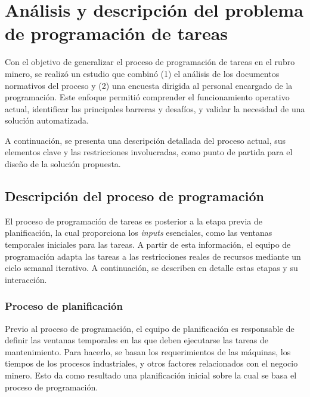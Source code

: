 \documentclass{article}
\begin{document}



\section{Análisis y descripción del problema de programación de tareas}

Con el objetivo de generalizar el proceso de programación de tareas en el rubro minero, se realizó un estudio que combinó (1) el análisis de los documentos normativos del proceso y (2) una encuesta dirigida al personal encargado de la programación. Este enfoque permitió comprender el funcionamiento operativo actual, identificar las principales barreras y desafíos, y validar la necesidad de una solución automatizada.

A continuación, se presenta una descripción detallada del proceso actual, sus elementos clave y las restricciones involucradas, como punto de partida para el diseño de la solución propuesta.


\subsection{Descripción del proceso de programación}

El proceso de programación de tareas es posterior a la etapa previa de planificación, la cual proporciona los \textit{inputs} esenciales, como las ventanas temporales iniciales para las tareas. A partir de esta información, el equipo de programación adapta las tareas a las restricciones reales de recursos mediante un ciclo semanal iterativo. A continuación, se describen en detalle estas etapas y su interacción.

\subsubsection{Proceso de planificación}

Previo al proceso de programación, el equipo de planificación es responsable de definir las ventanas temporales en las que deben ejecutarse las tareas de mantenimiento. Para hacerlo, se basan los requerimientos de las máquinas, los tiempos de los procesos industriales, y otros factores relacionados con el negocio minero. Esto da como resultado una planificación inicial sobre la cual se basa el proceso de programación.
\end{document}
